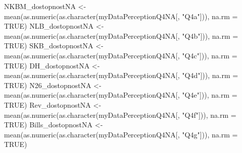 \documentclass[
]{article}
\newenvironment{Shaded}{\begin{snugshade}}{\end{snugshade}}
\newcommand{\AttributeTok}[1]{\textcolor[rgb]{0.77,0.63,0.00}{#1}}
\newcommand{\ConstantTok}[1]{\textcolor[rgb]{0.00,0.00,0.00}{#1}}
\newcommand{\FunctionTok}[1]{\textcolor[rgb]{0.00,0.00,0.00}{#1}}
\newcommand{\NormalTok}[1]{#1}
\newcommand{\OtherTok}[1]{\textcolor[rgb]{0.56,0.35,0.01}{#1}}
\newcommand{\StringTok}[1]{\textcolor[rgb]{0.31,0.60,0.02}{#1}}
\begin{document}
\begin{Shaded}
\begin{Highlighting}[]
\NormalTok{NKBM\_dostopnostNA }\OtherTok{\textless{}{-}} \FunctionTok{mean}\NormalTok{(}\FunctionTok{as.numeric}\NormalTok{(}\FunctionTok{as.character}\NormalTok{(myDataPerceptionQ4NA[, }\StringTok{"Q4a"}\NormalTok{])), }\AttributeTok{na.rm =} \ConstantTok{TRUE}\NormalTok{)}
\NormalTok{NLB\_dostopnostNA }\OtherTok{\textless{}{-}} \FunctionTok{mean}\NormalTok{(}\FunctionTok{as.numeric}\NormalTok{(}\FunctionTok{as.character}\NormalTok{(myDataPerceptionQ4NA[, }\StringTok{"Q4b"}\NormalTok{])), }\AttributeTok{na.rm =} \ConstantTok{TRUE}\NormalTok{)}
\NormalTok{SKB\_dostopnostNA }\OtherTok{\textless{}{-}} \FunctionTok{mean}\NormalTok{(}\FunctionTok{as.numeric}\NormalTok{(}\FunctionTok{as.character}\NormalTok{(myDataPerceptionQ4NA[, }\StringTok{"Q4c"}\NormalTok{])), }\AttributeTok{na.rm =} \ConstantTok{TRUE}\NormalTok{)}
\NormalTok{DH\_dostopnostNA }\OtherTok{\textless{}{-}} \FunctionTok{mean}\NormalTok{(}\FunctionTok{as.numeric}\NormalTok{(}\FunctionTok{as.character}\NormalTok{(myDataPerceptionQ4NA[, }\StringTok{"Q4d"}\NormalTok{])), }\AttributeTok{na.rm =} \ConstantTok{TRUE}\NormalTok{)}
\NormalTok{N26\_dostopnostNA }\OtherTok{\textless{}{-}} \FunctionTok{mean}\NormalTok{(}\FunctionTok{as.numeric}\NormalTok{(}\FunctionTok{as.character}\NormalTok{(myDataPerceptionQ4NA[, }\StringTok{"Q4e"}\NormalTok{])), }\AttributeTok{na.rm =} \ConstantTok{TRUE}\NormalTok{)}
\NormalTok{Rev\_dostopnostNA }\OtherTok{\textless{}{-}} \FunctionTok{mean}\NormalTok{(}\FunctionTok{as.numeric}\NormalTok{(}\FunctionTok{as.character}\NormalTok{(myDataPerceptionQ4NA[, }\StringTok{"Q4f"}\NormalTok{])), }\AttributeTok{na.rm =} \ConstantTok{TRUE}\NormalTok{)}
\NormalTok{Bills\_dostopnostNA }\OtherTok{\textless{}{-}} \FunctionTok{mean}\NormalTok{(}\FunctionTok{as.numeric}\NormalTok{(}\FunctionTok{as.character}\NormalTok{(myDataPerceptionQ4NA[, }\StringTok{"Q4g"}\NormalTok{])), }\AttributeTok{na.rm =} \ConstantTok{TRUE}\NormalTok{)}


\end{Highlighting}
\end{Shaded}
\end{document}
